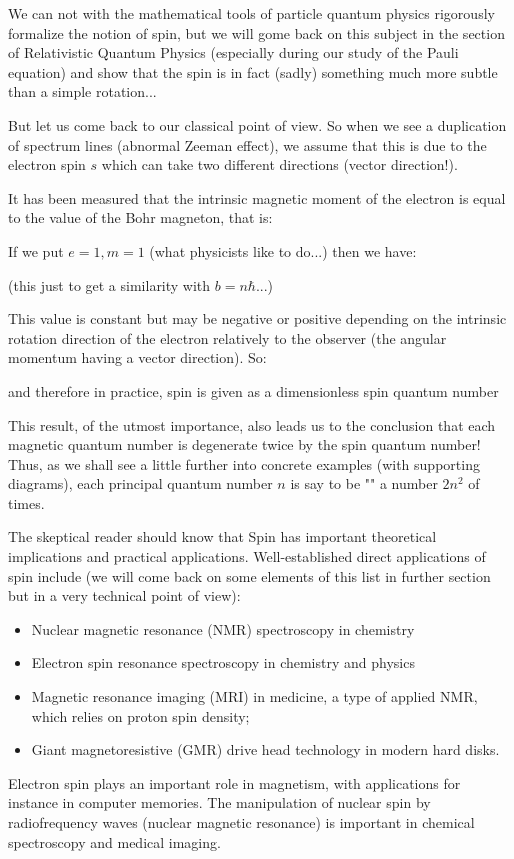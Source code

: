    We can not with the mathematical tools of particle quantum physics rigorously formalize the notion of spin, but we will gome back on this subject in the section of  Relativistic Quantum Physics (especially during our study of the Pauli equation) and show that the spin is in fact (sadly) something much more subtle than a simple rotation...

    But let us come back to our classical point of view. So when we see a duplication of spectrum lines (abnormal Zeeman effect), we assume that this is due to the electron spin $s$ which can take two different directions (vector direction!).

    It has been measured that the intrinsic magnetic moment of the electron is equal to the value of the Bohr magneton, that is:
    
    If we put $e=1,m=1$ (what physicists like to do...) then we have:
         
    (this just to get a similarity with $b=n\hbar$...)

     This value is constant but may be negative or positive depending on the intrinsic rotation direction of the electron relatively to the observer (the angular momentum having a vector direction). So:
    
    and therefore in practice, spin is given as a dimensionless spin quantum number 
     
    This result, of the utmost importance, also leads us to the conclusion that each magnetic quantum number is degenerate twice by the spin quantum number! Thus, as we shall see a little further into concrete examples (with supporting diagrams), each principal quantum number $n$ is say to be "" a number $2n^2$ of times.
    
    The skeptical reader should know that Spin has important theoretical implications and practical applications. Well-established direct applications of spin include (we will come back on some elements of this list in further section but in a very technical point of view):
   \begin{itemize}
      \item Nuclear magnetic resonance (NMR) spectroscopy in chemistry
       \item Electron spin resonance spectroscopy in chemistry and physics
       \item Magnetic resonance imaging (MRI) in medicine, a type of applied NMR, which relies on proton spin density;
       \item Giant magnetoresistive (GMR) drive head technology in modern hard disks.
   \end{itemize}
    Electron spin plays an important role in magnetism, with applications for instance in computer memories. The manipulation of nuclear spin by radiofrequency waves (nuclear magnetic resonance) is important in chemical spectroscopy and medical imaging.
     
